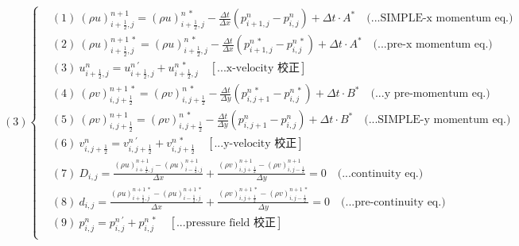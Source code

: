 \documentclass[12pt]{article}
\begin{document}
\begin{equation}
(3)
\left\{
\begin{aligned}
    &(1)\ (\rho u)_{i+\frac{1}{2},j}^{n+1} = (\rho u)_{i+\frac{1}{2},j}^{n\ *} - \frac{\Delta t}{\Delta x}(p_{i+1,j}^{n} - p_{i,j}^{n}) + \Delta t \cdot A^{*}  \quad \text{(...SIMPLE-x momentum eq.)}\\[1.5ex]
    &(2)\ (\rho u)_{i+\frac{1}{2},j}^{n+1\ *} = (\rho u)_{i+\frac{1}{2},j}^{n\ *} - \frac{\Delta t}{\Delta x}(p_{i+1,j}^{n\ *} - p_{i,j}^{n\ *}) + \Delta t \cdot A^{*}  \quad \text{(...pre-x momentum eq.)}\\[1.5ex]
    &(3)\ u_{i+\frac{1}{2},j}^{n} = u_{i+\frac{1}{2},j}^{n\ \prime} + u_{i+\frac{1}{2},j}^{n\ *}  \quad \left[\text{...x-velocity 校正}\right]\\[1.5ex]
    &(4)\ (\rho v)_{i,j+\frac{1}{2}}^{n+1\ *} = (\rho v)_{i,j+\frac{1}{2}}^{n\ *} - \frac{\Delta t}{\Delta y}(p_{i,j+1}^{n\ *} - p_{i,j}^{n\ *}) + \Delta t \cdot B^{*}  \quad \text{(...y pre-momentum eq.)}\\[1.5ex]
    &(5)\ (\rho v)_{i,j+\frac{1}{2}}^{n+1} = (\rho v)_{i,j+\frac{1}{2}}^{n\ *} - \frac{\Delta t}{\Delta y}(p_{i,j+1}^{n} - p_{i,j}^{n}) + \Delta t \cdot B^{*}  \quad \text{(...SIMPLE-y momentum eq.)}\\[1.5ex]
    &(6)\ v_{i,j+\frac{1}{2}}^{n} = v_{i,j+\frac{1}{2}}^{n\ \prime} + v_{i,j+\frac{1}{2}}^{n\ *} \quad \left[\text{...y-velocity 校正}\right]\\[1.5ex]
    &(7)\ D_{i,j} = \frac{(\rho u)_{i+\frac{1}{2},j}^{n+1} - (\rho u)_{i-\frac{1}{2},j}^{n+1}}{\Delta x} + \frac{(\rho v)_{i,j+\frac{1}{2}}^{n+1} - (\rho v)_{i,j-\frac{1}{2}}^{n+1}}{\Delta y} = 0 \quad \text{(...continuity eq.)}\\[1.5ex]
    &(8)\ d_{i,j} = \frac{(\rho u)_{i+\frac{1}{2},j}^{n+1\ *} - (\rho u)_{i-\frac{1}{2},j}^{n+1\ *}}{\Delta x} + \frac{(\rho v)_{i,j+\frac{1}{2}}^{n+1\ *} - (\rho v)_{i,j-\frac{1}{2}}^{n+1\ *}}{\Delta y} = 0 \quad \text{(...pre-continuity eq.)}\\[1.5ex]
    &(9)\ p_{i,j}^{n} = p_{i,j}^{n\ \prime} + p_{i,j}^{n\ *} \quad\left[\text{...pressure field 校正}\right]\\[1.5ex]
\end{aligned}
\right.
\end{equation}
\newpage
\end{document}
